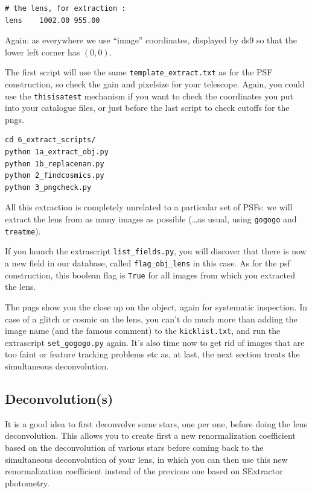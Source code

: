 \begin{Verbatim}[fontsize=\relsize{-2}]
# the lens, for extraction :
lens	1002.00	955.00
\end{Verbatim}
Again: as everywhere we use ``image'' coordinates, displayed by ds9 so that the lower left corner has $(0, 0)$.

The first script will use the same \verb+template_extract.txt+ as for the PSF construction, so check the gain and pixelsize for your telescope. Again, you could use the \verb+thisisatest+ mechanism if you want to check the coordinates you put into your catalogue files, or just before the last script to check cutoffs for the pngs.

\begin{Verbatim}
cd 6_extract_scripts/
python 1a_extract_obj.py
python 1b_replacenan.py
python 2_findcosmics.py
python 3_pngcheck.py
\end{Verbatim}

All this extraction is completely unrelated to a particular set of PSFs: we will extract the lens from as many images as possible (\ldots as usual, using \verb+gogogo+ and \verb+treatme+).

If you launch the extrascript \verb+list_fields.py+, you will discover that there is now a new field in our database, called \verb+flag_obj_lens+ in this case. As for the psf construction, this boolean flag is \verb+True+ for all images from which you extracted the lens.

The pngs show you the close up on the object, again for systematic inspection. In case of a glitch or cosmic on the lens, you can't do much more than adding the image name (and the famous comment) to the \verb+kicklist.txt+, and run the extrascript \verb+set_gogogo.py+ again. It's also time now to get rid of images that are too faint or feature tracking problems etc as, at last, the next section treats the simultaneous deconvolution.

\subsection{Deconvolution(s)}

It is a good idea to first deconvolve some stars, one per one, before doing the lens deconvolution. This allows you to create first a new renormalization coefficient based on the deconvolution of various stars before coming back to the simultaneous deconvolution of your lens, in which you can then use this new renormalization coefficient instead of the previous one based on SExtractor photometry.

